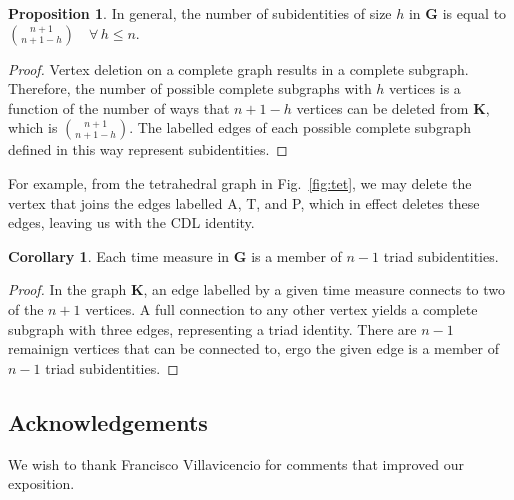 \documentclass{bmcart}
\theoremstyle{definition}
\newtheorem{proposition}{Proposition}[section]
\newtheorem{corollary}{Corollary}[proposition]
\begin{document}
\begin{proposition}
In general, the number of subidentities of size $h$ in $\textbf{G}$ is equal to
$\binom{n+1}{n+1-h} \quad \forall \, h \le n$.
\end{proposition}

\begin{proof}
Vertex deletion on a complete graph results in a complete subgraph. Therefore,
the number of possible complete subgraphs with $h$ vertices is a function of the
number of ways that $n+1-h$ vertices can be deleted from $\textbf{K}$, which is
$\binom{n+1}{n+1-h}$. The labelled edges of each possible complete subgraph
defined in this way represent subidentities.
\end{proof}

For example, from the tetrahedral graph in Fig.~\ref{fig:tet}, we may
delete the vertex that joins the edges labelled A, T, and P, which in effect
deletes these edges, leaving us with the CDL identity. 

\begin{corollary}
Each time measure in $\textbf{G}$ is a member of $n-1$ triad subidentities.
\end{corollary}

\begin{proof}
In the graph $\textbf{K}$, an edge labelled by a given time measure connects to
two of the $n+1$ vertices. A full connection to any other vertex yields a
complete subgraph with three edges, representing a triad identity. There are
$n-1$ remainign vertices that can be connected to, ergo the given edge is a
member of $n-1$ triad subidentities.
\end{proof}


\begin{backmatter}



\section*{Acknowledgements}
We wish to thank Francisco Villavicencio for comments that improved our
exposition.


  
\end{backmatter}
\end{document}
